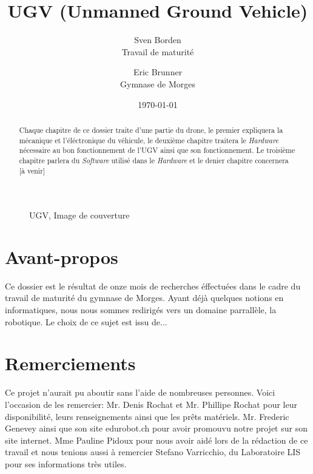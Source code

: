\documentclass[a4paper,12pt]{article}
\begin{document}
{\selectfont %
\title{UGV (Unmanned Ground Vehicle)}
\author{Sven Borden\\ \small Travail de maturité \and \normalsize Eric Brunner\\ \small Gymnase de Morges}

\date{\today}
\maketitle
\begin{center}
\begin{figure}[h!]
\caption{UGV, \small Image de couverture}
\end{figure}
\end{center}

\clearpage


\section*{Avant-propos}

Ce dossier est le résultat de onze mois de recherches éffectuées dans le cadre du travail de maturité du gymnase de Morges. Ayant déjà quelques notions en informatiques, nous nous sommes redirigés  vers un domaine parrallèle, la robotique. Le choix de ce sujet est issu de...

\clearpage

\section*{Remerciements}
Ce projet n'aurait pu aboutir sans l'aide de nombreuses personnes. Voici l'occasion de les remercier: Mr. Denis Rochat et Mr. Phillipe Rochat pour leur disponibilité, leurs renseignements ainsi que les prêts matériels. Mr. Frederic Genevey ainsi que son site edurobot.ch pour avoir promouvu notre projet sur son site internet. Mme Pauline Pidoux pour nous avoir aidé lors de la rédaction de ce travail et nous tenions aussi à remercier Stefano Varricchio, du Laboratoire LIS pour ses informations très utiles.

\clearpage
\begin{abstract}
Chaque chapitre de ce dossier traite d'une partie du drone, le premier expliquera la mécanique et l'éléctronique du véhicule, le deuxième chapitre traitera le \textit{Hardware} nécessaire au bon fonctionnement de l'UGV ainsi que son fonctionnement. Le troisième chapitre parlera du \textit{Software} utilisé dans le \textit{Hardware} et le denier chapitre concernera [à venir]
\end{abstract}
\clearpage
\tableofcontents
\clearpage
\listoffigures
\listoftables 
\clearpage



}
\end{document}
